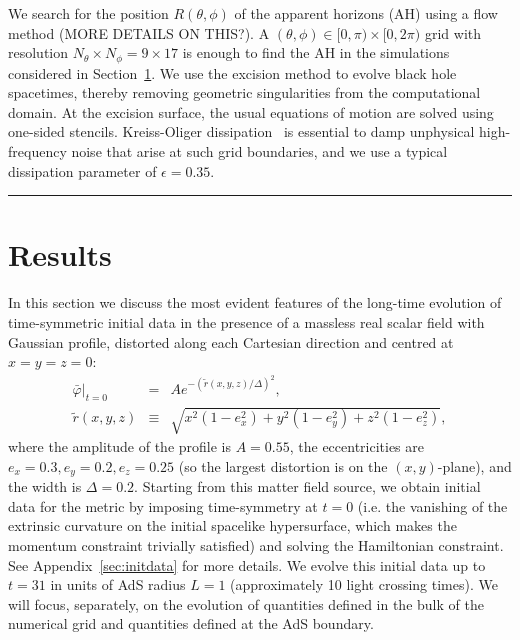 \documentclass[a4paper,11pt]{article}
\numberwithin{equation}{section}
\begin{document}
We search for the position $R(\theta,\phi)$ of the apparent horizons (AH) using a flow method (MORE DETAILS ON THIS?). A $(\theta,\phi)\in [0,\pi)\times [0,2\pi)$ grid with resolution $N_\theta\times N_\phi=9\times 17$ is enough to find the AH in the simulations considered in Section~\ref{sec:results}. We use the excision method to evolve black hole spacetimes, thereby removing geometric singularities from the computational domain. At the excision surface, the usual equations of motion are solved using one-sided stencils. 
Kreiss-Oliger dissipation~\cite{kreiss1973methods} is essential to damp unphysical high-frequency noise that arise at such grid boundaries, and we use a typical dissipation parameter of $\epsilon=0.35$.

\medskip\hrule height 2pt %

\section{Results}\label{sec:results}

In this section we discuss the most evident features of the long-time evolution of time-symmetric initial data in the presence of a massless real scalar field with Gaussian profile, distorted along each Cartesian direction and centred at $x=y=z=0$:
\begin{eqnarray}
\label{eq:scaGaupro}
\bar{\varphi}|_{t=0}&=&A e^{-(\tilde{r}(x,y,z)/\Delta)^2},\\
\tilde{r}(x,y,z)&\equiv&\sqrt{ x^2(1-e_x^2)+ y^2(1-e_y^2)+ z^2(1-e_z^2)}, \nonumber
\end{eqnarray}
where the amplitude of the profile is $A=0.55$, the eccentricities are $e_x=0.3, e_y=0.2, e_z=0.25$ (so the largest distortion is on the $(x,y)$-plane), and the width is $\Delta=0.2$. Starting from this matter field source, we obtain initial data for the metric by imposing time-symmetry at $t=0$ (i.e. the vanishing of the extrinsic curvature on the initial spacelike hypersurface, which makes the momentum constraint trivially satisfied) and solving the Hamiltonian constraint. See Appendix~\ref{sec:initdata} for more details. We evolve this initial data up to $t=31$ in units of AdS radius $L=1$ (approximately 10 light crossing times).  We will focus, separately, on the evolution of quantities defined in the bulk of the numerical grid and quantities defined at the AdS boundary.

\end{document}
